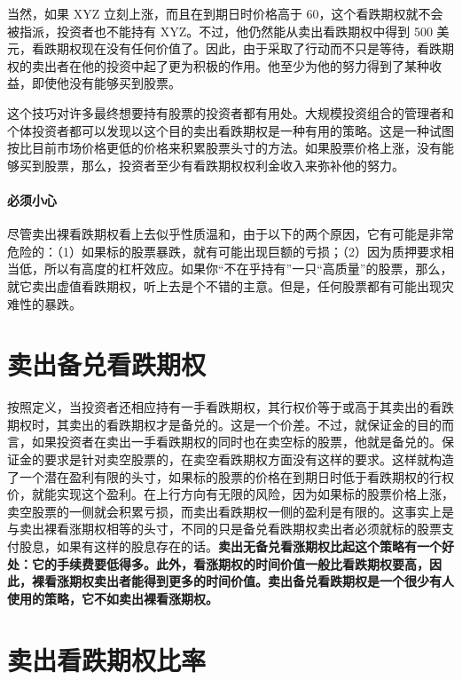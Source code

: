 当然，如果 XYZ 立刻上涨，而且在到期日时价格高于 60，这个看跌期权就不会被指派，投资者也不能持有 XYZ。不过，他仍然能从卖出看跌期权中得到 500 美元，看跌期权现在没有任何价值了。因此，由于采取了行动而不只是等待，看跌期权的卖出者在他的投资中起了更为积极的作用。他至少为他的努力得到了某种收益，即使他没有能够买到股票。

这个技巧对许多最终想要持有股票的投资者都有用处。大规模投资组合的管理者和个体投资者都可以发现以这个目的卖出看跌期权是一种有用的策略。这是一种试图按比目前市场价格更低的价格来积累股票头寸的方法。如果股票价格上涨，没有能够买到股票，那么，投资者至少有看跌期权权利金收入来弥补他的努力。

\paragraph{必须小心} 尽管卖出裸看跌期权看上去似乎性质温和，由于以下的两个原因，它有可能是非常危险的：（1）如果标的股票暴跌，就有可能出现巨额的亏损；（2）因为质押要求相当低，所以有高度的杠杆效应。如果你“不在乎持有”一只“高质量”的股票，那么，就它卖出虚值看跌期权，听上去是个不错的主意。但是，任何股票都有可能出现灾难性的暴跌。
\section{卖出备兑看跌期权}
按照定义，当投资者还相应持有一手看跌期权，其行权价等于或高于其卖出的看跌期权时，其卖出的看跌期权才是备兑的。这是一个价差。不过，就保证金的目的而言，如果投资者在卖出一手看跌期权的同时也在卖空标的股票，他就是备兑的。保证金的要求是针对卖空股票的，在卖空看跌期权方面没有这样的要求。这样就构造了一个潜在盈利有限的头寸，如果标的股票的价格在到期日时低于看跌期权的行权价，就能实现这个盈利。在上行方向有无限的风险，因为如果标的股票价格上涨，卖空股票的一侧就会积累亏损，而卖出看跌期权一侧的盈利是有限的。这事实上是与卖出裸看涨期权相等的头寸，不同的只是备兑看跌期权卖出者必须就标的股票支付股息，如果有这样的股息存在的话。\textbf{卖出无备兑看涨期权比起这个策略有一个好处：它的手续费要低得多。此外，看涨期权的时间价值一般比看跌期权要高，因此，裸看涨期权卖出者能得到更多的时间价值。卖出备兑看跌期权是一个很少有人使用的策略，它不如卖出裸看涨期权。}
\section{卖出看跌期权比率}